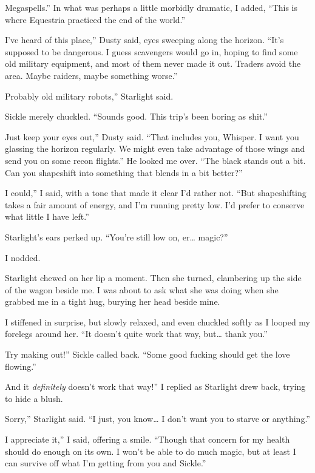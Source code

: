 \leavevmode{}Megaspells.” In what was perhaps a little morbidly dramatic, I added, “This is where Equestria practiced the end of the world.”

\leavevmode{}I’ve heard of this place,” Dusty said, eyes sweeping along the horizon. “It’s supposed to be dangerous. I guess scavengers would go in, hoping to find some old military equipment, and most of them never made it out. Traders avoid the area. Maybe raiders, maybe something worse.”

\leavevmode{}Probably old military robots,” Starlight said.

Sickle merely chuckled. “Sounds good. This trip’s been boring as shit.”

\leavevmode{}Just keep your eyes out,” Dusty said. “That includes you, Whisper. I want you glassing the horizon regularly. We might even take advantage of those wings and send you on some recon flights.” He looked me over. “The black stands out a bit. Can you shapeshift into something that blends in a bit better?”

\leavevmode{}I could,” I said, with a tone that made it clear I’d rather not. “But shapeshifting takes a fair amount of energy, and I’m running pretty low. I’d prefer to conserve what little I have left.”

Starlight’s ears perked up. “You’re still low on, er… magic?”

I nodded.

Starlight chewed on her lip a moment. Then she turned, clambering up the side of the wagon beside me. I was about to ask what she was doing when she grabbed me in a tight hug, burying her head beside mine.

I stiffened in surprise, but slowly relaxed, and even chuckled softly as I looped my forelegs around her. “It doesn’t quite work that way, but… thank you.”

\leavevmode{}Try making out!” Sickle called back. “Some good fucking should get the love flowing.”

\leavevmode{}And it \textit{definitely} doesn’t work that way!” I replied as Starlight drew back, trying to hide a blush.

\leavevmode{}Sorry,” Starlight said. “I just, you know… I don’t want you to starve or anything.”

\leavevmode{}I appreciate it,” I said, offering a smile. “Though that concern for my health should do enough on its own. I won’t be able to do much magic, but at least I can survive off what I’m getting from you and Sickle.”

